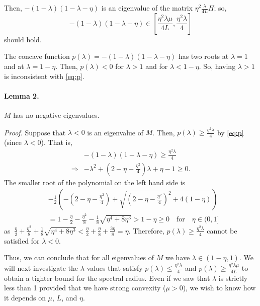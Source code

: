 \documentclass{article}
\begin{document}
Then, $-(1-\lambda)(1-\lambda-\eta)$ is an eigenvalue of the matrix $\eta^2 \displaystyle\frac{\lambda}{4L}H$; so,
\begin{equation}
 -(1-\lambda)(1-\lambda-\eta) \in \left[\frac{\eta^2\lambda\mu}{4L},\frac{\eta^2\lambda}{4}\right]
 \label{eq:p}
\end{equation}
should hold.

The concave function $p(\lambda)= -(1-\lambda)(1-\lambda-\eta)$ has two roots at $\lambda=1$ and at $\lambda=1-\eta$.  Then, $p(\lambda)<0$ for $\lambda>1$ and for $\lambda<1-\eta$.  So, having $\lambda>1$ is inconsistent with \eqref{eq:p}.  

\bigskip

\paragraph{Lemma 2.}$M$ has no negative eigenvalues.  

\bigskip

\noindent
\textit{Proof.} Suppose that $\lambda<0$ is an eigenvalue of $M$.  Then, $p(\lambda)\geq \displaystyle\frac{\eta^2 \lambda}{4}$ by \eqref{eq:p}(since $\lambda<0$). That is,
\begin{align*}
 &-(1-\lambda)(1-\lambda-\eta) \geq \displaystyle\frac{\eta^2 \lambda}{4}\\
 \Rightarrow&-\lambda^2+(2-\eta-\displaystyle\frac{\eta^2}{4})\lambda+\eta-1\geq 0.  
\end{align*}
The smaller root of the polynomial on the left hand side is
\begin{align*}
 &-\frac{1}{2}\left(-(2-\eta-\displaystyle\frac{\eta^2}{4})+\sqrt{(2-\eta-\displaystyle\frac{\eta^2}{4})^2+4(1-\eta)}\right)\\
 &=1-\frac{\eta}{2}-\frac{\eta^2}{8}-\frac{1}{8}\sqrt{\eta^4+8\eta^3}>1-\eta\geq 0 \quad \mbox{for}\quad \eta\in(0,1]
\end{align*}
as $\ \displaystyle\frac{\eta}{2}+\frac{\eta^2}{8}+\frac{1}{8}\sqrt{\eta^4+8\eta^3}<\frac{\eta}{2}+\frac{\eta}{8}+\frac{3\eta}{8}=\eta$.
Therefore, $p(\lambda)\geq \displaystyle\frac{\eta^2 \lambda}{4}$ cannot be satisfied for $\lambda<0$.  

\bigskip

Thus, we can conclude that for all eigenvalues of $M$ we have $\lambda\in(1-\eta,1)$.  We will next investigate the $\lambda$ values that satisfy $p(\lambda)\leq \displaystyle\frac{\eta^2 \lambda}{4}$ and $p(\lambda)\geq \displaystyle\frac{\eta^2 \lambda\mu}{4L}$ to obtain a tighter bound for the spectral radius.  Even if we saw that $\lambda$ is strictly less than 1 provided that we have strong convexity ($\mu>0$), we wish to know how it depends on $\mu$, $L$, and $\eta$.
\end{document}
